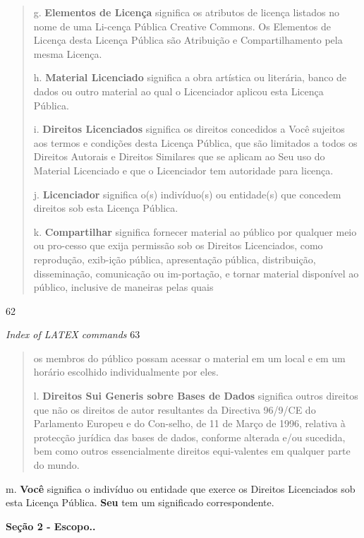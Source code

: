 \documentclass[
]{article}
\begin{document}
\begin{quote}
g. \textbf{Elementos de Licença} significa os atributos de licença
listados no nome de uma Li-cença Pública Creative Commons. Os Elementos
de Licença desta Licença Pública são Atribuição e Compartilhamento pela
mesma Licença.

h. \textbf{Material Licenciado} significa a obra artística ou literária,
banco de dados ou outro material ao qual o Licenciador aplicou esta
Licença Pública.

i. \textbf{Direitos Licenciados} significa os direitos concedidos a Você
sujeitos aos termos e condições desta Licença Pública, que são limitados
a todos os Direitos Autorais e Direitos Similares que se aplicam ao Seu
uso do Material Licenciado e que o Licenciador tem autoridade para
licença.

j. \textbf{Licenciador} significa o(s) indivíduo(s) ou entidade(s) que
concedem direitos sob esta Licença Pública.

k. \textbf{Compartilhar} significa fornecer material ao público por
qualquer meio ou pro-cesso que exija permissão sob os Direitos
Licenciados, como reprodução, exib-ição pública, apresentação pública,
distribuição, disseminação, comunicação ou im-portação, e tornar
material disponível ao público, inclusive de maneiras pelas quais
\end{quote}

62

\emph{Index of LATEX commands} 63

\begin{quote}
os membros do público possam acessar o material em um local e em um
horário escolhido individualmente por eles.

l. \textbf{Direitos Sui Generis sobre Bases de Dados} significa outros
direitos que não os direitos de autor resultantes da Directiva 96/9/CE
do Parlamento Europeu e do Con-selho, de 11 de Março de 1996, relativa à
protecção jurídica das bases de dados, conforme alterada e/ou sucedida,
bem como outros essencialmente direitos equi-valentes em qualquer parte
do mundo.
\end{quote}

m. \textbf{Você} significa o indivíduo ou entidade que exerce os
Direitos Licenciados sob esta Licença Pública. \textbf{Seu} tem um
significado correspondente.

\textbf{Seção 2 - Escopo..}
\end{document}
